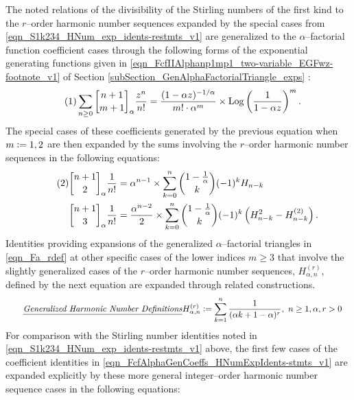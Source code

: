 \documentclass[12pt,reqno]{article}
\numberwithin{sfootnote}{section}
\numberwithin{equation}{section}
\newcommand{\tagonce}[0]{
     \addtocounter{equation}{1}
     \tag{\theequation}
}
\newcommand{\tagtext}[1]{\tag*{\underline{\textit{#1}}}}
\theoremstyle{plain}
\theoremstyle{definition}
\theoremstyle{remark}
\newcommand{\cf}[0]{cf.\ }
\newcommand{\defequals}{\ensuremath{\vcentcolon=}}
\newcommand{\gkpSI}[2]{\ensuremath{\genfrac{\lbrack}{\rbrack}{0pt}{}{#1}{#2}}}
\newcommand{\FcfII}[3]{\ensuremath{\gkpSI{#2}{#3}_{#1}}}
\DeclareMathOperator{\Log}{Log}
\begin{document}
The noted relations of the divisibility of the 
Stirling numbers of the first kind to the 
$r$--order harmonic number sequences expanded by the special cases from 
\eqref{eqn_S1k234_HNum_exp_idents-restmts_v1} 
are generalized to the $\alpha$--factorial function coefficient 
cases through the following forms of the 
exponential generating functions given in 
\eqref{eqn_FcfIIAlphanp1mp1_two-variable_EGFwz-footnote_v1} of 
Section \ref{subSection_GenAlphaFactorialTriangle_exps} 
\citep[\cf \S 3.3]{MULTIFACTJIS}: 
\begin{align*} 
\tagonce\label{eqn_FcfIIAlphanp1mp1_two-variable_EGFwz} 
\sum_{n \geq 0} \FcfII{\alpha}{n+1}{m+1} \frac{z^n}{n!} & = 
          \frac{(1- \alpha z)^{-1 / \alpha}}{m! \cdot \alpha^{m}} \times 
          \Log\left(\frac{1}{1-\alpha z}\right)^{m}. 
\end{align*} 
The special cases of these coefficients generated by the 
previous equation when $m \defequals 1,2$ are then expanded by the 
sums involving the $r$--order harmonic number sequences in the 
following equations: 
\begin{align*} 
\tagonce\label{eqn_FcfAlphaGenCoeffs_HNumExpIdents-stmts_v1} 
\FcfII{\alpha}{n+1}{2} \frac{1}{n!} & = 
     \alpha^{n-1} \times \sum_{k=0}^{n} 
     \binom{1-\frac{1}{\alpha}}{k} (-1)^{k} H_{n-k} \\ 
\FcfII{\alpha}{n+1}{3} \frac{1}{n!} & = 
     \frac{\alpha^{n-2}}{2} \times \sum_{k=0}^{n} 
     \binom{1-\frac{1}{\alpha}}{k} (-1)^{k} \left( 
     H_{n-k}^2 - H_{n-k}^{(2)} 
     \right). 
\end{align*} 
Identities providing expansions of the 
generalized $\alpha$--factorial triangles in \eqref{eqn_Fa_rdef} 
at other specific cases of the lower indices $m \geq 3$ 
that involve the slightly generalized cases of the 
$r$--order harmonic number sequences, $H_{\alpha,n}^{(r)}$, 
defined by the next equation 
are expanded through related constructions. 
\begin{align*} 
\tagtext{Generalized Harmonic Number Definitions} 
H_{\alpha,n}^{(r)} & \defequals 
     \sum_{k=1}^{n} \frac{1}{(\alpha k+1-\alpha)^{r}},\ 
     n \geq 1, \alpha, r > 0 
\end{align*} 
For comparison with the Stirling number identities noted in 
\eqref{eqn_S1k234_HNum_exp_idents-restmts_v1} above, the 
first few cases of the coefficient identities in 
\eqref{eqn_FcfAlphaGenCoeffs_HNumExpIdents-stmts_v1} 
are expanded explicitly by these more general integer--order 
harmonic number sequence cases in the following equations: 
\end{document}
